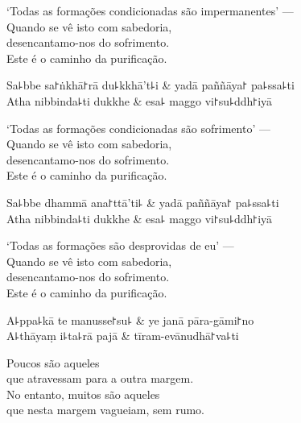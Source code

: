 \begin{english}
  `Todas as formações condicionadas são impermanentes' ---\\
  Quando se vê isto com sabedoria,\\
  desencantamo-nos do sofrimento.\\
  Este é o caminho da purificação.
\end{english}

\begin{twochants}
  Sa꜕bbe sa꜓ṅkhā꜓rā du꜕kkhā't꜕i & yadā paññāya꜓ pa꜕ssa꜕ti \\
  Atha nibbinda꜕ti dukkhe & esa꜕ maggo vi꜓su꜕ddh꜓iyā \\
\end{twochants}

\begin{english}
  `Todas as formações condicionadas são sofrimento' ---\\
  Quando se vê isto com sabedoria,\\
  desencantamo-nos do sofrimento.\\
  Este é o caminho da purificação.
\end{english}

\begin{twochants}
  Sa꜕bbe dhammā ana꜓ttā'ti꜕ & yadā paññāya꜓ pa꜕ssa꜕ti \\
  Atha nibbinda꜕ti dukkhe & esa꜕ maggo vi꜓su꜕ddh꜓iyā \\
\end{twochants}

\begin{english}
  `Todas as formações são desprovidas de eu' ---\\
  Quando se vê isto com sabedoria,\\
  desencantamo-nos do sofrimento.\\
  Este é o caminho da purificação.
\end{english}

\clearpage

\begin{twochants}
  A꜕ppa꜕kā te manusse꜓su꜕ & ye janā pāra-gāmi꜓no \\
  A꜕thāyaṃ i꜕ta꜕rā pajā & tīram-evānudhā꜓va꜕ti \\
\end{twochants}

\begin{english}
  Poucos são aqueles\\
  que atravessam para a outra margem.\\
  No entanto, muitos são aqueles\\
  que nesta margem vagueiam, sem rumo.
\end{english}

